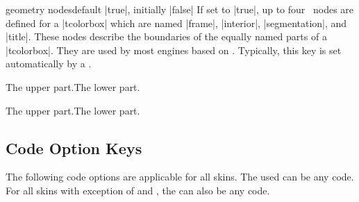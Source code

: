 \clearpage
\begin{docTcbKey}{geometry nodes}{}{default |true|, initially |false|}
  If set to |true|, up to four \tikzname\ nodes are defined for a |tcolorbox|
  which are named |frame|, |interior|, |segmentation|, and |title|. These nodes
  describe the boundaries of the equally named parts of a |tcolorbox|.
  They are used by most engines based on \tikzname.
  Typically, this key is set automatically by a .
\begin{dispExample}

\begin{tcolorbox}[adjusted title=The title]
  The upper part.\tcblower The lower part.
\end{tcolorbox}
\begin{tcolorbox}[enhanced,adjusted title=The title,
  frame code={\path[draw=red,fill=red!25]
      (frame.south west) rectangle (frame.north east);},
  interior titled code={\path[draw=blue,fill=blue!25]
      (interior.south west) rectangle (interior.north east);},
  segmentation code={\path[draw=green,fill=green!25]
      (segmentation.south west) rectangle (segmentation.north east);},
  title code={\path[draw=black,fill=brown!75!black]
      (title.south west) rectangle (title.north east);}]
  The upper part.\tcblower The lower part.
\end{tcolorbox}
\end{dispExample}
\end{docTcbKey}






\clearpage
\subsection{Code Option Keys}\label{subsec:addcodeoptions}
The following code options are applicable for all skins.
The used  can be any  code. For all skins
with exception of 
and , the  can also
be any  code.


